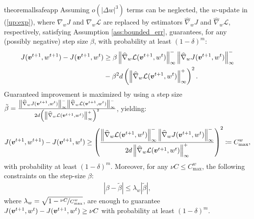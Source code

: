 \begin{restatable}[]{theorem}{allsafeapp}\label{th:safe_expapp}
	Assuming $o(|\Delta w|^3)$ terms can be neglected, the $w$-update in (\ref{up:exp}), where $\nabla_wJ$ and $\nabla_w\mathcal{L}$ are replaced by estimators $\widehat{\nabla}_wJ$ and $\widehat{\nabla}_w\mathcal{L}$, respectively, satisfying Assumption \ref{ass:bounded_err}, guarantees, for any (possibly negative) step size $\beta$, with probability at least $(1-\delta)^m$:
	\begin{align*}
	J(\vv^{t+1},w^{t+1}) - J(\vv^{t+1},w^t) 
	&\geq \beta\norm[\infty]{\widehat{\nabla}_w\mathcal{L}(\vv^{t+1},w^t)}^
	-\norm[\infty]{\widehat{\nabla}_wJ(\vv^{t+1},w^t)}^-\\
	&-
	\beta^2 d \left(\norm[\infty]{\widehat{\nabla}_w\mathcal{L}(\vv^{t+1},w^t)}^+\right)^2.
	\end{align*}
	Guaranteed improvement is maximized by using a step size $\tilde{\beta} =\frac{\norm[\infty]{\widehat{\nabla}_wJ(\vv^{t+1},w^t)}^-\norm[\infty]{\widehat{\nabla}_w\mathcal{L}(\vv^{t+1},w^t)}^-}{2d\left(\norm[\infty]{\widehat{\nabla}_w\mathcal{L}(\vv^{t+1},w^t)}^+\right)^2}$, yielding:
	\begin{align*}
	J(\vv^{t+1},w^{t+1}) - J(\vv^{t+1}, w^t) \geq 
	\left(\frac{\norm[\infty]{\widehat{\nabla}_w\mathcal{L}(\vv^{t+1},w^t)}^
		-\norm[\infty]{\widehat{\nabla}_wJ(\vv^{t+1},w^t)}^-}
	{2d\norm[\infty]{\widehat{\nabla}_w\mathcal{L}(\vv^{t+1},w^t)}^+}\right)^2
	\coloneqq C_{\text{max}}^w,
	\end{align*}
	with probability at least $(1-\delta)^m$. Moreover, for any $\nu C\leq C_{\text{max}}^{w}$, the following constraints on the step-size $\beta$:
	\begin{align}
	|\beta - \tilde{\beta}| \leq \lambda_{w}|\tilde{\beta}|,
	\end{align}
	where $\lambda_{w}=\sqrt{1 - \nicefrac{\nu C}{C_{\text{max}}^{w}}}$, are enough to guarantee $J(\vv^{t+1},w^t) - J(\vv^{t+1},w^t)\geq \nu C$ with probability at least $(1-\delta)^m$.
\end{restatable}

